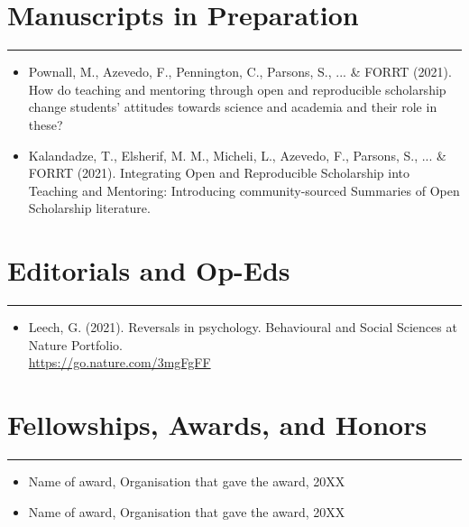 \documentclass{article}
\begin{document}
\section*{Manuscripts in Preparation}
\hrule
\vspace{1em}
\begin{itemize}[leftmargin=*]

\item[]{\noindent Pownall, M., Azevedo, F., Pennington, C., Parsons, S., ... \& FORRT (2021). How do teaching and mentoring through open and reproducible scholarship change students' attitudes towards science and academia and their role in these?}

\item[]{\noindent Kalandadze, T., Elsherif, M. M.,  Micheli, L., Azevedo, F., Parsons, S., ... \& FORRT (2021). Integrating Open and Reproducible Scholarship into Teaching and Mentoring: Introducing community-sourced Summaries of Open Scholarship literature.}

\end{itemize}

\section*{Editorials and Op-Eds}
\hrule
\vspace{1em}

\begin{itemize}[leftmargin=*]

\item[]{\noindent Leech, G. (2021). Reversals in psychology. Behavioural and Social Sciences at Nature Portfolio.
\\
\href{https://go.nature.com/3mgFgFF}{\color{BlueViolet}https://go.nature.com/3mgFgFF}}

\end{itemize}

\section*{Fellowships, Awards, and Honors}
\hrule
\vspace{1em}
\begin{itemize}[leftmargin=*]
    \item[]Name of award, Organisation that gave the award, 20XX
    \item[]Name of award, Organisation that gave the award, 20XX
\end{itemize}
\end{document}
